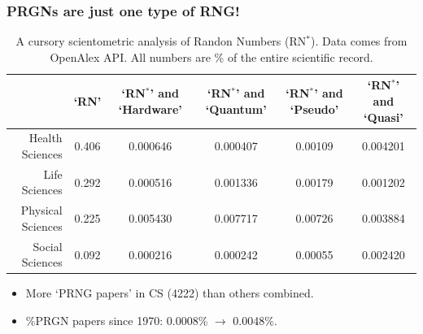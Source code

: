 \documentclass[12pt]{beamer}
\begin{document}
\begin{frame}
\frametitle{PRGNs are just one type of RNG!}

\begin{table}[!t]
\begin{center}
\begin{scriptsize}
\begin{tabular}{rccccc}\toprule
&  \thead{`RN'\\} &  \thead{`RN$^*$' and \\ `Hardware'} &  \thead{`RN$^*$' and \\ `Quantum'} &  \thead{`RN$^*$' and \\ `Pseudo'} &  \thead{`RN$^*$' and \\ `Quasi'} \\ \midrule
Health Sciences   & 0.406 & 0.000646                          & 0.000407                         & 0.00109                        & 0.004201                       \\
Life Sciences     & 0.292  & 0.000516                          & 0.001336                         & 0.00179                        & 0.001202                       \\
Physical Sciences & 0.225 & 0.005430                          & 0.007717                         & 0.00726                       & 0.003884                       \\
Social Sciences   & 0.092            & 0.000216                          & 0.000242                         & 0.00055                        & 0.002420 \\ \bottomrule               
\end{tabular}
\caption*{
\footnotesize{A cursory scientometric analysis of Randon Numbers (RN$^*$). Data comes from OpenAlex API. All numbers are \% of the entire scientific record.}
}
\end{scriptsize}
\end{center}
\end{table}

\begin{itemize}
\item More `PRNG papers' in CS (4222) than others combined.\\ \vspace{.05in}
\item \%PRGN papers since 1970: 0.0008\% $\rightarrow$ 0.0048\%.
\end{itemize}


\end{frame}
\end{document}

